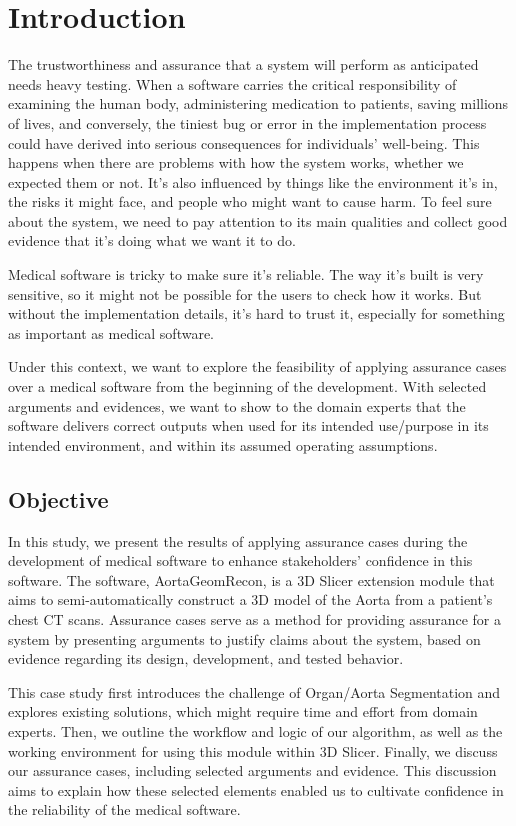 \chapter{Introduction} \label{intro}
The trustworthiness and assurance that a system will perform as anticipated needs heavy testing. When a software carries the critical responsibility of examining the human body, administering medication to patients, saving millions of lives, and conversely, the tiniest bug or error in the implementation process could have derived into serious consequences for individuals' well-being. This happens when there are problems with how the system works, whether we expected them or not. It's also influenced by things like the environment it's in, the risks it might face, and people who might want to cause harm. To feel sure about the system, we need to pay attention to its main qualities and collect good evidence that it's doing what we want it to do.

Medical software is tricky to make sure it's reliable. The way it's built is very sensitive, so it might not be possible for the users to check how it works. But without the implementation details, it's hard to trust it, especially for something as important as medical software.

Under this context, we want to explore the feasibility of applying assurance cases over a medical software from the beginning of the development. With selected arguments and evidences, we want to show to the domain experts that the software delivers correct outputs when used for its intended use/purpose in its intended environment, and within its assumed operating assumptions.

\section{Objective} \label{obj}
In this study, we present the results of applying assurance cases during the development of medical software to enhance stakeholders' confidence in this software. The software, AortaGeomRecon, is a 3D Slicer extension module that aims to semi-automatically construct a 3D model of the Aorta from a patient's chest CT scans. Assurance cases serve as a method for providing assurance for a system by presenting arguments to justify claims about the system, based on evidence regarding its design, development, and tested behavior.

This case study first introduces the challenge of Organ/Aorta Segmentation and explores existing solutions, which might require time and effort from domain experts. Then, we outline the workflow and logic of our algorithm, as well as the working environment for using this module within 3D Slicer. Finally, we discuss our assurance cases, including selected arguments and evidence. This discussion aims to explain how these selected elements enabled us to cultivate confidence in the reliability of the medical software.

